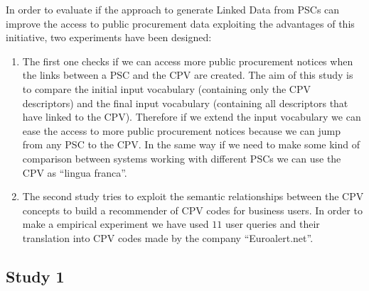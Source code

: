 In order to evaluate if the approach to generate Linked Data from PSCs can improve the access to public procurement data 
exploiting the advantages of this initiative, two experiments have been designed:
\begin{enumerate}
 \item The first one checks if we can access more public procurement notices when the links between a PSC and the CPV are created. 
 The aim of this study is to compare the initial input vocabulary (containing only the CPV descriptors) and the final 
 input vocabulary (containing all descriptors that have linked to the CPV). Therefore if we extend the input vocabulary we can ease the access to 
 more public procurement notices because we can jump from any PSC to the CPV. In the same way if we need to make some kind of comparison 
 between systems working with different PSCs we can use the CPV as ``lingua franca''.
 
 \item The second study tries to exploit the semantic relationships between the CPV concepts to build a recommender of CPV codes for business users. 
 In order to make a empirical experiment we have used $11$ user queries and their translation into CPV codes made by the company ``Euroalert.net''.
\end{enumerate}

\subsection{Study 1}
